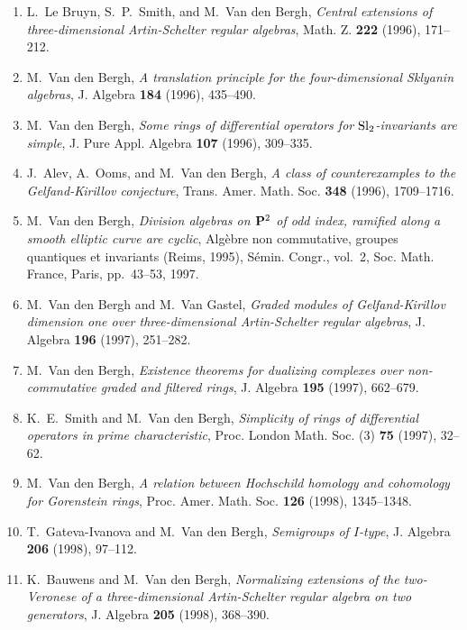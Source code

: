 \begin{enumerate}
\item
L.~Le Bruyn, S.~P.~Smith, and M.~Van den Bergh, {\em Central extensions of three-dimensional Artin-Schelter regular algebras}, Math. Z. {\bf 222} (1996), 171--212.

\item
M.~Van den Bergh, {\em A translation principle for the four-dimensional Sklyanin algebras}, J. Algebra {\bf 184} (1996), 435--490.

\item
M.~Van den Bergh, {\em Some rings of differential operators for $\rm {S}l\sb 2$-invariants are simple}, J. Pure Appl. Algebra {\bf 107} (1996), 309--335.

\item
J.~Alev, A.~Ooms, and M.~Van den Bergh, {\em A class of counterexamples to the Gelfand-Kirillov conjecture}, Trans. Amer. Math. Soc. {\bf 348} (1996), 1709--1716.

\item
M.~Van den Bergh, {\em Division algebras on ${\bf P}\sp 2$ of odd index, ramified along a smooth elliptic curve are cyclic}, Alg\`ebre non commutative, groupes quantiques et invariants (Reims, 1995), S\'emin. Congr., vol.~2, Soc. Math. France, Paris, pp.~43--53, 1997.

\item
M.~Van den Bergh and M.~Van Gastel, {\em Graded modules of Gelfand-Kirillov dimension one over three-dimensional Artin-Schelter regular algebras}, J. Algebra {\bf 196} (1997), 251--282.

\item
M.~Van den Bergh, {\em Existence theorems for dualizing complexes over non-commutative graded and filtered rings}, J. Algebra {\bf 195} (1997), 662--679.

\item
K.~E.~Smith and M.~Van den Bergh, {\em Simplicity of rings of differential operators in prime characteristic}, Proc. London Math. Soc. (3) {\bf 75} (1997), 32--62.

\item
M.~Van den Bergh, {\em A relation between Hochschild homology and cohomology for Gorenstein rings}, Proc. Amer. Math. Soc. {\bf 126} (1998), 1345--1348.

\item
T.~Gateva-Ivanova and M.~Van den Bergh, {\em Semigroups of $I$-type}, J. Algebra {\bf 206} (1998), 97--112.

\item
K.~Bauwens and M.~Van den Bergh, {\em Normalizing extensions of the two-Veronese of a three-dimensional Artin-Schelter regular algebra on two generators}, J. Algebra {\bf 205} (1998), 368--390.


\end{enumerate}
